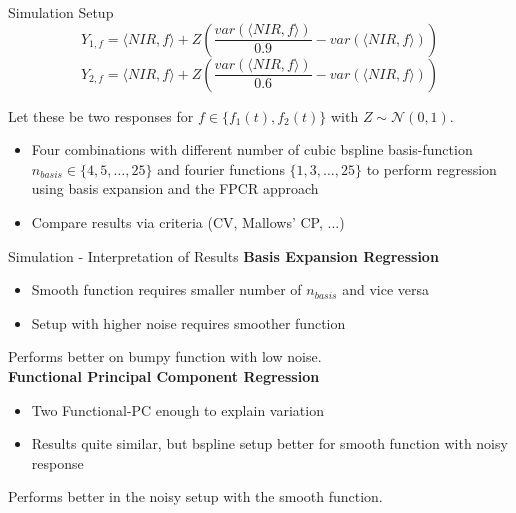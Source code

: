 \documentclass{beamer}
\begin{document}
	
	\begin{frame}{Simulation Setup}
		$$Y_{1,f} = \langle NIR, f\rangle + Z\left(  \frac{var(\langle NIR, f\rangle)}{0.9} - var(\langle NIR, f\rangle)\right)$$ 
		$$Y_{2,f} = \langle NIR, f\rangle + Z\left( \frac{var(\langle NIR, f\rangle)}{0.6} - var(\langle NIR, f\rangle)\right)$$
		
		Let these be two responses for $f \in \{f_1(t), f_2(t)\}$ with $Z \sim \mathcal{N}(0,1)$.	
		\vspace{0.2cm}
		
		\begin{itemize}
    		\item Four combinations with different number of cubic bspline basis-function $n_{basis} \in \{4,5, \dots ,25\}$ and fourier functions $\{1,3, \dots, 25\}$ to perform regression using basis expansion and the FPCR approach
			\item Compare results via criteria (CV, Mallows' CP, ...)
		
		\end{itemize}
	\end{frame}
	
	\begin{frame}{Simulation - Interpretation of Results}\label{Results}
		\textbf{Basis Expansion Regression}
		\begin{itemize}
    			\item Smooth function requires smaller number of $n_{basis}$ and vice versa
    			\item Setup with higher noise requires smoother function
    			
		\end{itemize}
		 	
		Performs better on bumpy function with low noise.\\
	\vspace{0.4cm}
		\textbf{Functional Principal Component Regression}
    	\begin{itemize}
    		\item Two Functional-PC enough to explain variation
    		\item Results quite similar, but bspline setup better for smooth function with noisy response
    		
    	\end{itemize}
    	 
    	Performs better in the noisy setup with the smooth function.\\
    	\vspace{0.4cm}
    

    	
    	\hyperlink{Simulation}{}
    	\hyperlink{Simulation2}{}
	\end{frame}
\end{document}

